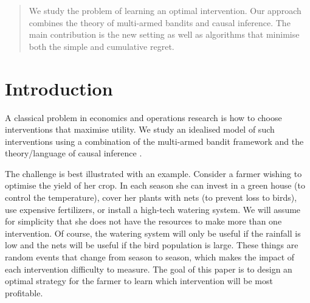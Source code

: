 \documentclass{article}
\newcommand{\tinytodo}[2][]{\todo[size=\tiny]{#2}}
\newcommand{\todot}[2][]{\tinytodo[color=blue!20, #1]{T: #2}} %
\theoremstyle{plain}
\theoremstyle{definition}
\begin{document}
 


\begin{abstract} 
\todot{This can use some work}
We study the problem of learning an optimal intervention. Our approach combines the theory of multi-armed bandits
and causal inference. The main contribution is the new setting as well as algorithms that minimise both the simple and cumulative regret.
\end{abstract} 

\section{Introduction}

A classical problem in economics and operations research is how to choose interventions that maximise utility. 
We study an idealised model of such interventions using a combination of the multi-armed bandit framework \citep{Robbins1952} and the theory/language of causal inference 
\citep{Pearl2000}.

The challenge is best illustrated with an example. Consider a farmer wishing to optimise the yield of her crop. In each season she can invest in a green house (to control
the temperature), cover her plants with nets (to prevent loss to birds), use expensive fertilizers, or install a high-tech watering system. We will assume for
simplicity that she does not have the resources to make more than one intervention. Of course, the watering system will only be useful if the rainfall is low and
the nets will be useful if the bird population is large. These things are random events that change from season to season, which makes the impact of each intervention
difficulty to measure. The goal of this paper is to design an optimal strategy for the farmer to learn which intervention will be most profitable.
\end{document}
